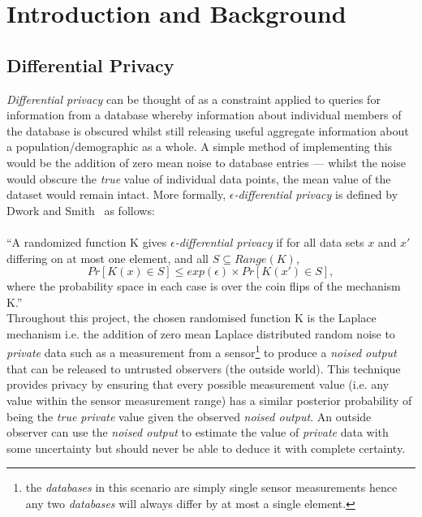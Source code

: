 \documentclass[12pt]{article}
\begin{document}
\newpage


\pagestyle{default}
%
%

\section{Introduction and Background}
  \subsection{Differential Privacy} \label{intro_diff_priv}
    \textit{Differential privacy} can be thought of as a constraint applied to queries for information from a database whereby information about individual members of the database is obscured whilst still releasing useful aggregate information about a population/demographic as a whole. A simple method of implementing this would be the addition of zero mean noise to database entries --- whilst the noise would obscure the \textit{true} value of individual data points, the mean value of the dataset would remain intact. More formally, \textit{$\epsilon$-differential privacy} is defined by Dwork and Smith~\cite{dwork2010differential} as follows:\\
    \\
    ``A randomized function K gives \textit{$\epsilon$-differential privacy} if for all data sets $x$ and $x'$ differing on at most one element, and all $S \subseteq Range(K)$,
    \begin{equation}
      Pr[K(x) \in S] \leq exp(\epsilon) \times Pr[K(x') \in S],
    \end{equation}
    where the probability space in each case is over the coin flips of the mechanism K.''\\

    Throughout this project, the chosen randomised function K is the Laplace mechanism i.e. the addition of zero mean Laplace distributed random noise to \textit{private} data such as a measurement from a sensor\footnote{the \textit{databases} in this scenario are simply single sensor measurements hence any two \textit{databases} will always differ by at most a single element.} to produce a \textit{noised output} that can be released to untrusted observers (the outside world). This technique provides privacy by ensuring that every possible measurement value (i.e. any value within the sensor measurement range) has a similar posterior probability of being the \textit{true private} value given the observed \textit{noised output}. An outside observer can use the \textit{noised output} to estimate the value of \textit{private} data with some uncertainty but should never be able to deduce it with complete certainty.\\
\end{document}
